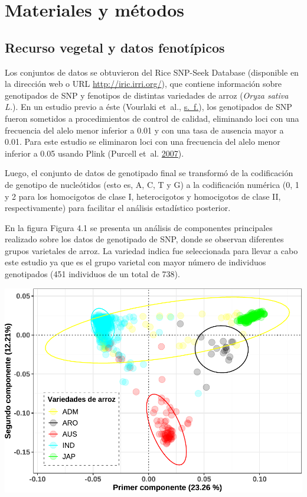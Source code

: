 \documentclass[11pt,spanish,a4paper,oneside,]{book} %
\begin{document}
\hypertarget{materiales-y-muxe9todos}{%
\chapter{Materiales y métodos}\label{materiales-y-muxe9todos}}

\hypertarget{recurso-vegetal-y-datos-fenotuxedpicos}{%
\section{Recurso vegetal y datos fenotípicos}\label{recurso-vegetal-y-datos-fenotuxedpicos}}

Los conjuntos de datos se obtuvieron del Rice SNP-Seek Database (disponible en la dirección web o URL \url{http://iric.irri.org/}), que contiene información sobre genotipados de SNP y fenotipos de distintas variedades de arroz (\emph{Oryza sativa L.}). En un estudio previo a éste (Vourlaki et~al., \protect\hyperlink{ref-cite:26}{s.~f.}), los genotipados de SNP fueron sometidos a procedimientos de control de calidad, eliminando loci con una frecuencia del alelo menor inferior a 0.01 y con una tasa de ausencia mayor a 0.01. Para este estudio se eliminaron loci con una frecuencia del alelo menor inferior a 0.05 usando Plink (Purcell et~al. \protect\hyperlink{ref-cite:49}{2007}).

Luego, el conjunto de datos de genotipado final se transformó de la codificación de genotipo de nucleótidos (esto es, A, C, T y G) a la codificación numérica (0, 1 y 2 para los homocigotos de clase I, heterocigotos y homocigotos de clase II, respectivamente) para facilitar el análisis estadístico posterior.

En la figura Figura 4.1 se presenta un análisis de componentes principales realizado sobre los datos de genotipado de SNP, donde se observan diferentes grupos varietales de arroz. La variedad indica fue seleccionada para llevar a cabo este estudio ya que es el grupo varietal con mayor número de individuos genotipados (451 individuos de un total de 738).

\begin{center}\includegraphics[width=1\linewidth]{figures/Graf_PCA} \end{center}
\end{document}
